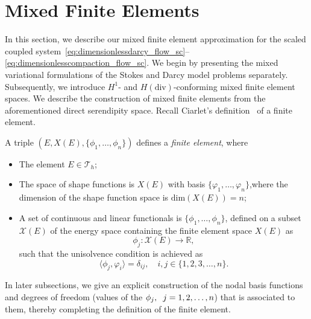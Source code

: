 \section{Mixed Finite Elements}
\label{sec:mfem}
In this section, we describe our mixed finite element approximation for the scaled coupled system~\eqref{eq:dimensionlessdarcy_flow_sc}--\eqref{eq:dimensionlesscompaction_flow_sc}. 
We begin by presenting the mixed variational formulations of the Stokes and Darcy model problems separately. 
Subsequently, we introduce $H^1$- and $H(\text{div})$-conforming mixed finite element spaces.
We describe the construction of mixed finite elements from the aforementioned direct serendipity space.
Recall Ciarlet's definition~\cite{doi:10.1137/1.9780898719208} 
of a finite element.
\begin{defn}\label{def:ciarletFEM}
		  A triple $(E, X(E), \{\phi_1,\ldots,\phi_n\})$ defines a \textit{finite element}, where
		  \begin{itemize}
					 \item The element $E \in \mathcal{T}_h$;
					 \item The space of shape functions is $X(E)$ with
								basis $\{\varphi_1,\ldots,\varphi_n\}$,where
								the dimension of
								the shape function space is $\text{dim}(X(E)) = n$;
					 \item A set of continuous and linear functionals is $\{\phi_1,\ldots,\phi_n \}$, defined on a subset $\mathcal{X}(E)$
								of the energy space containing the finite element space $X(E)$ as
								\begin{equation}
										  \phi_j : \mathcal{X}(E) \rightarrow \mathbb{R},
								\end{equation}
								such that the unisolvence condition is achieved as
								\begin{equation}
										  \langle \phi_j, \varphi_i \rangle = \delta_{ij}, \quad i,j \in \{1,2,3,\dots, n \}.
								\end{equation}
		  \end{itemize}
\end{defn}
In later subsections, we give an explicit construction of the nodal basis functions and degrees of freedom (values of the $\phi_j,\hspace{0.2cm}j=1,2,\ldots,n$) that is 
associated to them, thereby completing the definition of the finite element.

